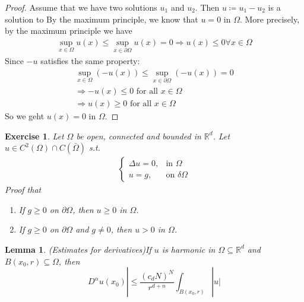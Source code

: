 \documentclass{report}
\theoremstyle{tommy}
\newtheorem{lem}[defn]{Lemma}
\newtheorem{ex}[defn]{Exercise}
\begin{document}
\begin{proof}
  Assume that we have two solutions \(u_1\) and \(u_2\). Then \(u \coloneqq u_1 - u_2\) is a solution to 
  By the maximum principle, we know that \(u = 0\) in \(\Omega\). More precisely, by the maximum principle we have
  \begin{align*}
    \sup_{x \in \Omega} u(x) \le \sup_{x \in \partial \Omega} u(x) = 0
    \Rightarrow u(x) \le 0 \forall x \in \Omega
  \end{align*}
  Since \(-u\) satisfies the same property:
  \begin{align*}
    \sup_{x \in \Omega}(-u(x)) \le \sup_{x \in \partial \Omega} (-u(x)) = 0 \\
    \Rightarrow - u(x) \le 0 \text{ for all } x \in \Omega \\
    \Rightarrow u(x) \ge 0 \text{ for all } x \in \Omega
  \end{align*}
  So we geht \(u(x)  = 0\) in \(\Omega\).
\end{proof}

\begin{ex}
  Let \(\Omega\) be open, connected and bounded in \(\mathbb{R}^d\). Let \(u \in C^2(\Omega) \cap C(\bar \Omega)\) s.t. 
  \begin{align*}
    \begin{cases}
      \Delta u = 0, &\text{in } \Omega \\
      u = g, &\text{on } \delta \Omega
    \end{cases}
  \end{align*}
  Proof that \begin{enumerate}
    \item If \(g \ge 0\) on \(\partial \Omega\), then \(u \ge 0\) in \(\Omega\). 
    \item If \(g \ge 0\) on \(\partial \Omega\) and \(g \ne 0\), then \(u > 0\) in \(\Omega\).
  \end{enumerate}
\end{ex}

\begin{lem} (Estimates for derivatives)\label{estimates-of-derivatives} If \(u\) is harmonic in \(\Omega \subseteq \mathbb{R}^d\) and \(B(x_0, r) \subseteq \Omega\), then 
  \[D^\alpha u(x_0)| \le \frac{(c_d N)^N}{r^{d+n}} \int_{B(x_0, r)} |u|\]
\end{lem}
\end{document}
